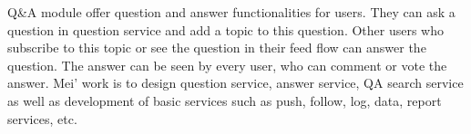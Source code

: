 \documentclass[runningheads]{llncs}
\begin{document}
    
    \noindent
    Q\&A module offer question and answer functionalities for users. They can ask a question in question service and add a topic to this question. Other users who subscribe to this topic or see the question in their feed flow can answer the question. The answer can be seen by every user, who can comment or vote the answer. Mei' work is to design question service, answer service, QA search service as well as development of basic services such as push, follow, log, data, report services, etc.
\end{document}
